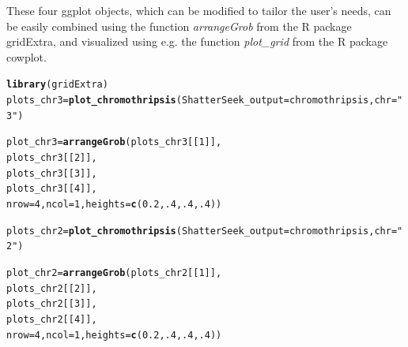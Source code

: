 \documentclass[twoside,a4wide,11pt]{article}\usepackage[]{graphicx}\usepackage[]{color}
\makeatletter
\newcommand{\hlnum}[1]{\textcolor[rgb]{0.686,0.059,0.569}{#1}}%
\newcommand{\hlstr}[1]{\textcolor[rgb]{0.192,0.494,0.8}{#1}}%
\newcommand{\hlstd}[1]{\textcolor[rgb]{0.345,0.345,0.345}{#1}}%
\newcommand{\hlkwb}[1]{\textcolor[rgb]{0.69,0.353,0.396}{#1}}%
\newcommand{\hlkwc}[1]{\textcolor[rgb]{0.333,0.667,0.333}{#1}}%
\newcommand{\hlkwd}[1]{\textcolor[rgb]{0.737,0.353,0.396}{\textbf{#1}}}%
\newenvironment{kframe}{%
 \def\at@end@of@kframe{}%
 \ifinner\ifhmode%
  \def\at@end@of@kframe{\end{minipage}}%
  \begin{minipage}{\columnwidth}%
 \fi\fi%
 \def\FrameCommand##1{\hskip\@totalleftmargin \hskip-\fboxsep
 \colorbox{shadecolor}{##1}\hskip-\fboxsep
     \hskip-\linewidth \hskip-\@totalleftmargin \hskip\columnwidth}%
 \MakeFramed {\advance\hsize-\width
   \@totalleftmargin\z@ \linewidth\hsize
   \@setminipage}}%
 {\par\unskip\endMakeFramed%
 \at@end@of@kframe}
\newenvironment{knitrout}{}{} %
\makeatother
\begin{document}
These four ggplot objects, which can be modified to tailor the user's needs, 
can be easily combined using the function {\it arrangeGrob} from the R package gridExtra,
and visualized using e.g. the function {\it plot\_grid} from the R package cowplot.

\begin{knitrout}
\color{fgcolor}\begin{kframe}
\begin{alltt}
\hlkwd{library}\hlstd{(gridExtra)}
\hlstd{plots_chr3} \hlkwb{=} \hlkwd{plot_chromothripsis}\hlstd{(}\hlkwc{ShatterSeek_output} \hlstd{= chromothripsis,}\hlkwc{chr} \hlstd{=} \hlstr{"3"}\hlstd{)}
\end{alltt}


{\ttfamily\noindent\bfseries{}}\begin{alltt}
\hlstd{plot_chr3} \hlkwb{=} \hlkwd{arrangeGrob}\hlstd{(plots_chr3[[}\hlnum{1}\hlstd{]],}
                        \hlstd{plots_chr3[[}\hlnum{2}\hlstd{]],}
                        \hlstd{plots_chr3[[}\hlnum{3}\hlstd{]],}
                        \hlstd{plots_chr3[[}\hlnum{4}\hlstd{]],}
                        \hlkwc{nrow}\hlstd{=}\hlnum{4}\hlstd{,}\hlkwc{ncol}\hlstd{=}\hlnum{1}\hlstd{,}\hlkwc{heights}\hlstd{=}\hlkwd{c}\hlstd{(}\hlnum{0.2}\hlstd{,}\hlnum{.4}\hlstd{,}\hlnum{.4}\hlstd{,}\hlnum{.4}\hlstd{))}
\end{alltt}


{\ttfamily\noindent\bfseries\color{errorcolor}{\#\# Error in arrangeGrob(plots\_chr3[[1]], plots\_chr3[[2]], plots\_chr3[[3]], : object 'plots\_chr3' not found}}\begin{alltt}
\hlstd{plots_chr2} \hlkwb{=} \hlkwd{plot_chromothripsis}\hlstd{(}\hlkwc{ShatterSeek_output} \hlstd{= chromothripsis,}\hlkwc{chr} \hlstd{=} \hlstr{"2"}\hlstd{)}
\end{alltt}


{\ttfamily\noindent\bfseries{}}\begin{alltt}
\hlstd{plot_chr2} \hlkwb{=} \hlkwd{arrangeGrob}\hlstd{(plots_chr2[[}\hlnum{1}\hlstd{]],}
                        \hlstd{plots_chr2[[}\hlnum{2}\hlstd{]],}
                        \hlstd{plots_chr2[[}\hlnum{3}\hlstd{]],}
                        \hlstd{plots_chr2[[}\hlnum{4}\hlstd{]],}
                         \hlkwc{nrow}\hlstd{=}\hlnum{4}\hlstd{,}\hlkwc{ncol}\hlstd{=}\hlnum{1}\hlstd{,}\hlkwc{heights}\hlstd{=}\hlkwd{c}\hlstd{(}\hlnum{0.2}\hlstd{,}\hlnum{.4}\hlstd{,}\hlnum{.4}\hlstd{,}\hlnum{.4}\hlstd{))}
\end{alltt}



\end{kframe}
\end{knitrout}
\end{document}

